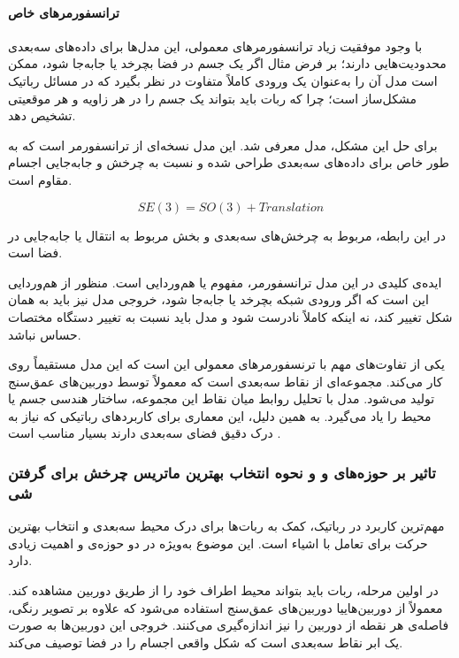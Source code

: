 \documentclass{article}
\begin{document}
\paragraph{ ترانسفورمرهای خاص }
با وجود موفقیت زیاد ترانسفورمرهای معمولی، این مدل‌ها برای داده‌های سه‌بعدی محدودیت‌هایی دارند؛ بر فرض مثال اگر یک جسم در فضا بچرخد یا جابه‌جا شود، ممکن است مدل آن را به‌عنوان یک ورودی کاملاً متفاوت در نظر بگیرد که در مسائل رباتیک مشکل‌ساز است؛ چرا که ربات باید بتواند یک جسم را در هر زاویه و هر موقعیتی تشخیص دهد.

برای حل این مشکل، مدل  معرفی شد. این مدل نسخه‌ای از ترانسفورمر است که به طور خاص برای داده‌های سه‌بعدی طراحی شده و نسبت به چرخش و جابه‌جایی اجسام مقاوم است.


\[
SE(3)=SO(3)+Translation
\]

در این رابطه،  مربوط به چرخش‌های سه‌بعدی و بخش  مربوط به انتقال یا جابه‌جایی در فضا است.

ایده‌ی کلیدی در این مدل ترانسفورمر، مفهوم  یا هم‌وردایی است. منظور از هم‌وردایی این است که اگر ورودی شبکه بچرخد یا جابه‌جا شود، خروجی مدل نیز باید به همان شکل تغییر کند، نه اینکه کاملاً نادرست شود و مدل باید نسبت به تغییر دستگاه مختصات حساس نباشد.

یکی از تفاوت‌های مهم  با ترنسفورمرهای معمولی این است که این مدل مستقیماً روی  کار می‌کند.  مجموعه‌ای از نقاط سه‌بعدی است که معمولاً توسط دوربین‌های عمق‌سنج   تولید می‌شود. 
مدل با تحلیل روابط میان نقاط این مجموعه، ساختار هندسی جسم یا محیط را یاد می‌گیرد. به همین دلیل، این معماری برای کاربردهای رباتیکی که نیاز به درک دقیق فضای سه‌بعدی دارند بسیار مناسب است \cite{fuchs2020}.

\subsubsection{تاثیر بر حوزه‌های  و  و نحوه انتخاب بهترین ماتریس چرخش برای گرفتن شی}
مهم‌ترین کاربرد  در رباتیک، کمک به ربات‌ها برای درک محیط سه‌بعدی و انتخاب بهترین حرکت برای تعامل با اشیاء است. این موضوع به‌ویژه در دو حوزه‌ی  و  اهمیت زیادی دارد.

در اولین مرحله، ربات باید بتواند محیط اطراف خود را از طریق دوربین مشاهده کند. معمولاً از دوربین‌هاییا دوربین‌های عمق‌سنج استفاده می‌شود که علاوه بر تصویر رنگی، فاصله‌ی هر نقطه از دوربین را نیز اندازه‌گیری می‌کنند. خروجی این دوربین‌ها به صورت یک ابر نقاط  سه‌بعدی است که شکل واقعی اجسام را در فضا توصیف می‌کند.
\end{document}
